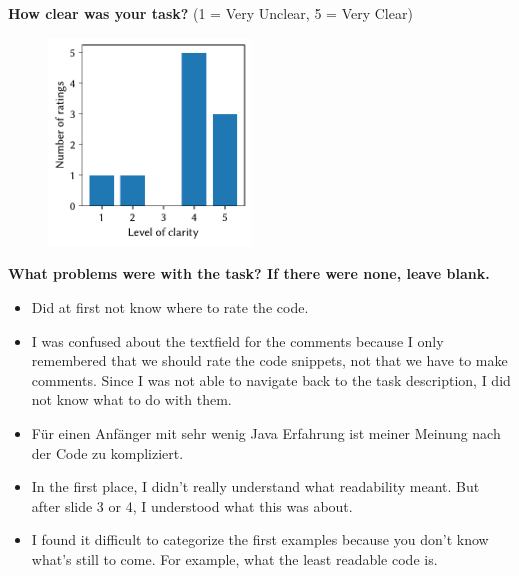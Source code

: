 \documentclass[%
class=scrreprt,
chapterprefix=false,%
open=right,%
twoside=false,%
paper=a4,%
logofile={Logo\_zentral\_farbig\_EN.png},%
thesistype=master,%
UKenglish,%
]{se2thesis}
\theoremstyle{definition}
\begin{document}
	\textbf{How clear was your task?} (1 = Very Unclear, 5 = Very Clear)
	\begin{figure}[h!]
		\centering
		\includegraphics[width=0.48\textwidth]{img/pilot_survey_task_clearness.pdf}
		\label{fig:pilot-task-clear}
	\end{figure}
	
	\textbf{What problems were with the task? If there were none, leave blank.}
	\begin{itemize}
		\item Did at first not know where to rate the code.
		\item I was confused about the textfield for the comments because I only remembered that we should rate the code snippets, not that we have to make comments. Since I was not able to navigate back to the task description, I did not know what to do with them.
		\item Für einen Anfänger mit sehr wenig Java Erfahrung ist meiner Meinung nach der Code zu kompliziert.
		\item In the first place, I didn't really understand what readability meant. But after slide 3 or 4, I understood what this was about.
		\item I found it difficult to categorize the first examples because you don't know what's still to come. For example, what the least readable code is.
	\end{itemize}
\end{document}
